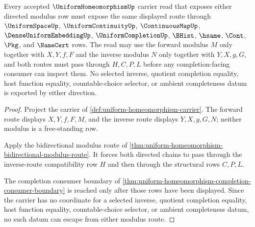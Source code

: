 \begin{theorem}
\label{thm:uniform-homeomorphism-bidirectional-modulus-nonescape}
Every accepted $\UniformHomeomorphismUp$ carrier read that exposes either directed modulus row must expose the same displayed route through $\UniformSpaceUp$, $\UniformContinuityUp$, $\ContinuousMapUp$, $\DenseUniformEmbeddingUp$, $\UniformCompletionUp$, $\BHist$, $\hsame$, $\Cont$, $\Pkg$, and $\NameCert$ rows. The read may use the forward modulus $M$ only together with $X,Y,f,F$ and the inverse modulus $N$ only together with $Y,X,g,G$, and both routes must pass through $H,C,P,L$ before any completion-facing consumer can inspect them. No selected inverse, quotient completion equality, host function equality, countable-choice selector, or ambient completeness datum is exported by either direction.
\end{theorem}
\begin{proof}
Project the carrier of \autoref{def:uniform-homeomorphism-carrier}. The forward route displays $X,Y,f,F,M$, and the inverse route displays $Y,X,g,G,N$; neither modulus is a free-standing row.

Apply the bidirectional modulus route of \autoref{thm:uniform-homeomorphism-bidirectional-modulus-route}. It forces both directed chains to pass through the inverse-route compatibility row $H$ and then through the structural rows $C,P,L$.

The completion consumer boundary of \autoref{thm:uniform-homeomorphism-completion-consumer-boundary} is reached only after those rows have been displayed. Since the carrier has no coordinate for a selected inverse, quotient completion equality, host function equality, countable-choice selector, or ambient completeness datum, no such datum can escape from either modulus route.
\end{proof}

